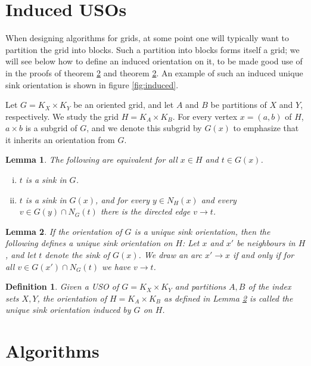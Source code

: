 \documentclass[a4paper,10pt]{article}
\newtheorem{lemma}{Lemma}
\newtheorem{definition}{Definition}
\begin{document}
\section{Induced USOs}

When designing algorithms for grids, at some point one will typically want to
partition the grid into blocks.
Such a partition into blocks forms itself a grid;
we will see below how to define an induced orientation on it,
to be made good use of in the proofs of theorem \ref{} and theorem \ref{}.
An example of such an induced unique sink orientation is shown in figure
\ref{fig:induced}.

Let $G = K_X \times K_Y$ be an oriented grid,
and let $A$ and $B$ be partitions of $X$ and $Y$, respectively.
We study the grid $H = K_A \times K_B$.
For every vertex $x = (a,b)$ of $H$, $a \times b$ is a subgrid of $G$, and we
denote this subgrid by $G(x)$ to emphasize that it inherits an orientation
from $G$.

\begin{lemma}
    The following are equivalent for all $x \in H$ and $t \in G(x)$.
        \begin{enumerate}[(i)]
            \item
                $t$ is a sink in $G$.
            \item
                $t$ is a sink in $G(x)$, and for every $y \in N_H(x)$ and
                every $v \in G(y) \cap N_G(t)$ there is the directed edge
                $v \to t$.
        \end{enumerate}
\end{lemma}

\begin{lemma}
    \label{lemma:induced}
    If the orientation of $G$ is a unique sink orientation,
    then the following defines a unique sink orientation on $H$:
    Let $x$ and $x'$ be neighbours in $H$, and let $t$ denote the sink of
    $G(x)$.
    We draw an arc $x' \to x$ if and only if for all
    $v \in G(x') \cap N_G(t)$ we have $v \to t$.
\end{lemma}

\begin{definition}
    Given a USO of $G = K_X \times K_Y$ and partitions $A,B$ of the index sets
    $X,Y$, the orientation of $H = K_A \times K_B$
    as defined in Lemma \ref{lemma:induced} is called the \emph{unique
    sink orientation induced by $G$ on $H$}.
\end{definition}

\section{Algorithms}
\end{document}
